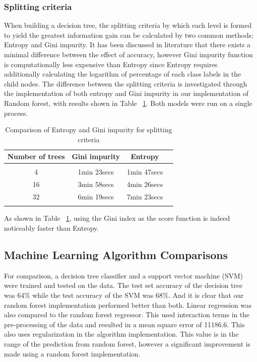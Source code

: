 \documentclass{article} %
\begin{document}
\subsubsection{Splitting criteria}

When building a decision tree, the splitting criteria by which each level is formed to yield the greatest information gain can be calculated by two common methods; Entropy and Gini impurity. It has been discussed in literature that there exists a minimal difference between the effect of accuracy, however Gini impurity function is computationally less expensive than Entropy since Entropy requires additionally calculating the logarithm of percentage of each class labels in the child nodes. The difference between the splitting criteria is investigated through the implementation of both entropy and Gini impurity in our implementation of Random forest, with results shown in Table ~\ref{ent-gini}. Both models were run on a single process.

\begin{table}[h]
\caption{Comparison of Entropy and Gini impurity for splitting criteria}
\begin{center}
\begin{tabular}{cccc}
{\bf Number of trees} &{\bf Gini impurity} &{\bf Entropy}
\\ \hline \\
4	&1min 23secs    &1min 47secs\\
16	&3min 58secs    &4min 26secs\\
32	&6min 19secs    &7min 23secs\\
\label{ent-gini}
\end{tabular}
\end{center}
\end{table}

As shown in Table ~\ref{ent-gini}, using the Gini index as the score function is indeed noticeably faster than Entropy.


\subsection{Machine Learning Algorithm Comparisons}

For comparison, a decision tree classifier and a support vector machine (SVM) were trained and tested on the data.
 The test set accuracy of the decision tree was 64\% while the test accuracy of the SVM was 68\%.  And it is clear that our random forest implementation performed better than both.
 Linear regression was also compared to the random forest regressor.
 This used interaction terms in the pre-processing of the data and resulted in a mean square error of 11186.6. 
This also uses regularization in the algorithm implementation.
 This value is in the range of the prediction from random forest, however a significant improvement is made using a random forest implementation.
\end{document}
